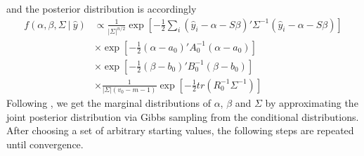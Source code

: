 \documentclass[a4paper,fleqn,11pt]{article}
\begin{document}
and the posterior distribution is accordingly
\begin{align*}
f(\alpha,\beta,\Sigma\ |\ \hat{y}) & \propto \frac{1}{|\Sigma|^{n/2}}\exp\left[-\frac{1}{2} \sum_i (\hat{y}_i - \alpha - S\beta)'\Sigma^{-1}(\hat{y}_i - \alpha - S\beta)\right] \\
&\times \exp \left[-\frac{1}{2}(\alpha - a_0)'A_0^{-1}(\alpha - a_0)\right] \\
&\times \exp \left[-\frac{1}{2}(\beta - b_0)'B_0^{-1}(\beta - b_0)\right] \\
&\times \frac{1}{|\Sigma|(v_0 - m - 1)} \exp \left[-\frac{1}{2} tr(R_0^{-1}\Sigma^{-1}) \right]
\end{align*}
Following \cite{Percy1992}, we get the marginal distributions of $\alpha$, $\beta$ and $\Sigma$ by approximating the joint posterior distribution via Gibbs sampling from the conditional distributions. After choosing a set of arbitrary starting values, the following steps are repeated until convergence.
\end{document}
